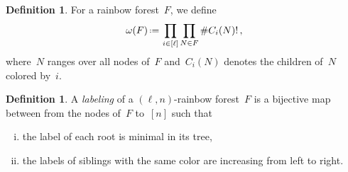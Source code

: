 \documentclass{amsart}
\newcommand{\darkblue}{\color{darkblue}} %
\theoremstyle{definition}
\newtheorem{definition}[theorem]{Definition}
\newcommand{\eqdef}{\mbox{\,\raisebox{0.2ex}{\scriptsize\ensuremath{\mathrm:}}\ensuremath{=}\,}} %
\newcommand{\defn}[1]{\textsl{\darkblue #1}} %
\newcommand{\OEIS}[1]{\cite[{\rm \href{http://oeis.org/#1}{\texttt{#1}}}]{OEIS}}
\begin{document}
\begin{table}
	\centerline{}
	\vspace{.3cm}
	\caption{The Fuss-Catalan numbers~$F_{\ell,m} = \frac{1}{(\ell-1)m+1} \binom{\ell m}{m}$ for~$\ell,m \in [9]$. See \OEIS{A062993}.}
\end{table}

\begin{definition}
For a rainbow forest~$F$, we define
\[
\omega(F) \eqdef \prod_{i \in [\ell]} \prod_{N \in F} \#C_i(N)! \, ,
\]
where~$N$ ranges over all nodes of~$F$ and~$C_i(N)$ denotes the children of~$N$ colored by~$i$.
\end{definition}

\begin{definition}
\label{def:labelingRainbowForest}
A \defn{labeling} of a $(\ell,n)$-rainbow forest~$F$ is a bijective map between from the nodes of~$F$ to~$[n]$ such that
\begin{enumerate}[(i)]
\item the label of each root is minimal in its tree,
\item the labels of siblings with the same color are increasing from left to right.
\end{enumerate}
\end{definition}
\end{document}
